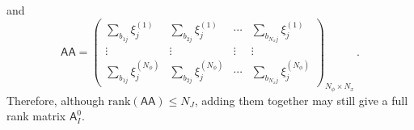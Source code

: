 \documentclass[english,reqno]{amsart}
\theoremstyle{plain}
\theoremstyle{definition} %
\newcommand{\Amat}{\mathsf{A}}
\newcommand{\AAmat}{\mathsf{AA}}
\begin{document}
and
\begin{equation*}
\AAmat = \left( \begin{array}{cccc} 
\sum_{b_{1j}} \xi_{j}^{(1)}  & \sum_{b_{2j}} \xi_{j}^{(1)} & \cdots & \sum_{b_{N_xj}} \xi_{j}^{(1)}\\
\vdots & \vdots & \vdots & \vdots
\\ 
\sum_{b_{1j}} \xi_{j}^{(N_\phi)}  & \sum_{b_{2j}} \xi_{j}^{(N_\phi)} & \cdots & \sum_{b_{N_xj}} \xi_{j}^{(N_\phi)} 
\end{array} \right)_{N_\phi \times N_x}\,.
\end{equation*}
Therefore, although $\text{rank}(\AAmat) \leq N_J$, adding them together may still give a full rank matrix $\Amat_I^0$.






\end{document}
